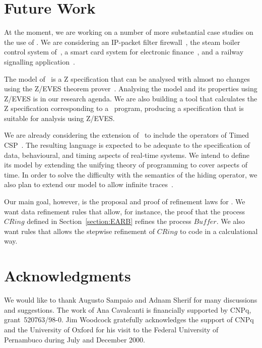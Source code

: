 \documentclass{article}
\begin{document}
\section{Future Work} \label{section:FW}

At the moment, we are working on a number of more substantial case
studies on the use of \Circus.  We are considering an IP-packet filter
firewall~\cite{WM99}, the steam boiler control system
of~\cite{ABL96,Bau93,WC01d}, a smart card system for electronic
finance~\cite{SCW00}, and a railway signalling
application~\cite{Woo99}.

The model of \Circus\ is a Z specification that can be analysed with
almost no changes using the Z/EVES theorem prover~\cite{ZEVES00}.
Analysing the model and its properties using Z/EVES is in our research
agenda.  We are also building a tool that calculates the Z
specification corresponding to a \Circus\ program, producing a
specification that is suitable for analysis using Z/EVES.

We are already considering the extension of \Circus\ to include the
operators of Timed CSP~\cite{Dav93}.  The resulting language is
expected to be adequate to the specification of data, behavioural, and
timing aspects of real-time systems.  We intend to define its model by
extending the unifying theory of programming to cover aspects of time.
In order to solve the difficulty with the semantics of the hiding
operator, we also plan to extend our model to allow infinite
traces~\cite{Ros98}.

Our main goal, however, is the proposal and proof of refinement laws
for \Circus.  We want data refinement rules that allow, for instance,
the proof that the process $CRing$ defined in
Section~\ref{section:EARB} refines the process $Buffer$.  We also want
rules that allows the stepwise refinement of $CRing$ to code in a
calculational way.

\section*{Acknowledgments}

We would like to thank Augusto Sampaio and Adnam Sherif for many
discussions and suggestions.  The work of Ana Cavalcanti is
financially supported by CNPq, grant~\mbox{520763/98-0}.  Jim Woodcock
gratefully acknowledges the support of CNPq and the University of
Oxford for his visit to the Federal University of Pernambuco during
July and December 2000.


\end{document}
